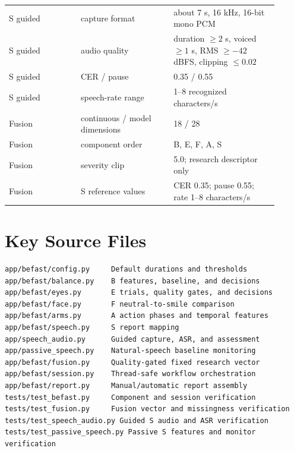 \documentclass[11pt,a4paper]{article}
\begin{document}
\begin{longtable}{p{0.24\linewidth}p{0.31\linewidth}p{0.35\linewidth}}
S guided & capture format & about 7 s, 16 kHz, 16-bit mono PCM \\
S guided & audio quality & duration $\geq2$ s, voiced $\geq1$ s, RMS $\geq-42$ dBFS, clipping $\leq0.02$ \\
S guided & CER / pause & 0.35 / 0.55 \\
S guided & speech-rate range & 1--8 recognized characters/s \\
Fusion & continuous / model dimensions & 18 / 28 \\
Fusion & component order & B, E, F, A, S \\
Fusion & severity clip & 5.0; research descriptor only \\
Fusion & S reference values & CER 0.35; pause 0.55; rate 1--8 characters/s \\
\bottomrule
\end{longtable}

\section{Key Source Files}

\begin{verbatim}
app/befast/config.py     Default durations and thresholds
app/befast/balance.py    B features, baseline, and decisions
app/befast/eyes.py       E trials, quality gates, and decisions
app/befast/face.py       F neutral-to-smile comparison
app/befast/arms.py       A action phases and temporal features
app/befast/speech.py     S report mapping
app/speech_audio.py      Guided capture, ASR, and assessment
app/passive_speech.py    Natural-speech baseline monitoring
app/befast/fusion.py     Quality-gated fixed research vector
app/befast/session.py    Thread-safe workflow orchestration
app/befast/report.py     Manual/automatic report assembly
tests/test_befast.py     Component and session verification
tests/test_fusion.py     Fusion vector and missingness verification
tests/test_speech_audio.py Guided S audio and ASR verification
tests/test_passive_speech.py Passive S features and monitor verification
\end{verbatim}
\end{document}
